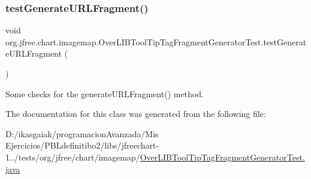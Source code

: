 \subsubsection{\texorpdfstring{test\+Generate\+U\+R\+L\+Fragment()}{testGenerateURLFragment()}}
{\footnotesize\ttfamily void org.\+jfree.\+chart.\+imagemap.\+Over\+L\+I\+B\+Tool\+Tip\+Tag\+Fragment\+Generator\+Test.\+test\+Generate\+U\+R\+L\+Fragment (\begin{DoxyParamCaption}{ }\end{DoxyParamCaption})}

Some checks for the generate\+U\+R\+L\+Fragment() method. 

The documentation for this class was generated from the following file\+:\begin{DoxyCompactItemize}
\item 
D\+:/ikasgaiak/programacion\+Avanzada/\+Mis Ejercicios/\+P\+B\+Ldefinitibo2/libs/jfreechart-\/1../tests/org/jfree/chart/imagemap/\mbox{\hyperlink{_over_l_i_b_tool_tip_tag_fragment_generator_test_8java}{Over\+L\+I\+B\+Tool\+Tip\+Tag\+Fragment\+Generator\+Test.\+java}}\end{DoxyCompactItemize}
